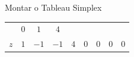 \begin{frame}
\begin{columns}
\begin{column}{0.7\textwidth}
{\begin{block}{Montar o Tableau Simplex}
\begin{table}
\begin{tabular}{c c c c c c c c c}
							& \cellcolor{yellow!60}  $ \scriptstyle 0$
							& \cellcolor{yellow!60}  $ \scriptstyle 1$ 
							& \cellcolor{yellow!60}  $ \scriptstyle 4$ \\
							\cellcolor{blue!80} \color{white} $ \scriptstyle z$
							& \cellcolor{yellow!60}  $ \scriptstyle 1$
							& \cellcolor{yellow!60}  $ \scriptstyle -1$ 
							& \cellcolor{yellow!60}  $ \scriptstyle -1$
							& \cellcolor{yellow!60}  $ \scriptstyle 4$
							& \cellcolor{yellow!60}  $ \scriptstyle 0$
							& \cellcolor{yellow!60}  $ \scriptstyle 0$
							& \cellcolor{yellow!60}  $ \scriptstyle 0$ 
							& \cellcolor{yellow!60}  $ \scriptstyle 0$ \\
		 				\end{tabular}
		 			\end{table}
		 		\end{block}
	 		}
 		\end{column}
	\end{columns}
\end{frame}

